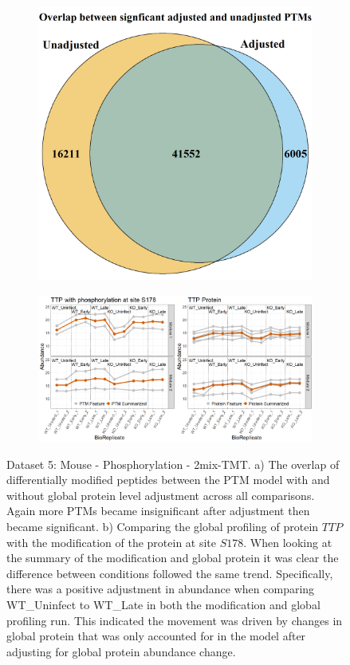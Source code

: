 \documentclass[mcp]{article}
\numberwithin{table}{section}
\begin{document}
\begin{figure}[h!]
\centering
\begin{subfigure}{\textwidth}
 \centering
\includegraphics[height=.5\textwidth]{images/shig_venn_diagramm.png}
\caption{}
\label{fig:data5_venn_diagram}
 \end{subfigure}
 \begin{subfigure}{\textwidth}
 \centering
	\includegraphics[width=1.0\textwidth]{images/No_Difference_Shigella_Profile_Plot}
	\caption{}
	\label{fig:data5_profile_plot}
	 \end{subfigure}
\caption{Dataset 5: Mouse - Phosphorylation - 2mix-TMT. a) The overlap of differentially modified peptides between the PTM model with and without global protein level adjustment across all comparisons. Again more PTMs became insignificant after adjustment then became significant. b) Comparing the global profiling of protein $TTP$ with the modification of the protein at site $S178$. When looking at the summary of the modification and global protein it was clear the difference between conditions followed the same trend. Specifically, there was a positive adjustment in abundance when comparing WT\_Uninfect to WT\_Late in both the modification and global profiling run. This indicated the movement was driven by changes in global protein that was only accounted for in the model after adjusting for global protein abundance change.}
\label{fig:data5_plots}
\end{figure}
\end{document}
